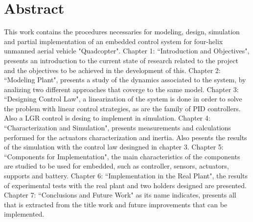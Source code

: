 \documentclass[\main/main.tex]{subfiles}
\begin{document}
\chapter{Abstract}	
This work contains the procedures necessaries for modeling, design, simulation and partial implementation of an embedded control system for four-helix unmanned aerial vehicle "Quadcopter".
\hfill \break
Chapter 1: “Introduction and Objectives", presents an introduction to the current state of research related to the project and the objectives to be achieved in the development of this.
\hfill \break
Chapter 2: “Modeling Plant", presents a study of the dynamics associated to the system, by analizing two different approaches that coverge to the same model.
\hfill \break
Chapter 3: “Designing Control Law", a linearization of the system is done in order to solve the problem with linear control strategies, as are the family of PID controllers. Also a LGR control is desing to implement in simulation. 
\hfill \break
Chapter 4: “Characterization and Simulation", presents measurements and calculations performed for the actuators characterization and inertia. Also pesents the results of the simulation with the control law desingned in chapter 3.
\hfill \break
Chapter 5: “Components for Implementation", the main characteristics of the components are studied to be used for embedded, such as controller, sensors, actuators, supports and battery.
\hfill \break
Chapter 6: “Implementation in the Real Plant", the results of experimental tests with the real plant and two holders designed are presented.
\hfill \break
Chapter 7: “Conclusions and Future Work" as its name indicates, presents all that is extracted from the title work and future improvements that can be implemented.
	
\end{document}
